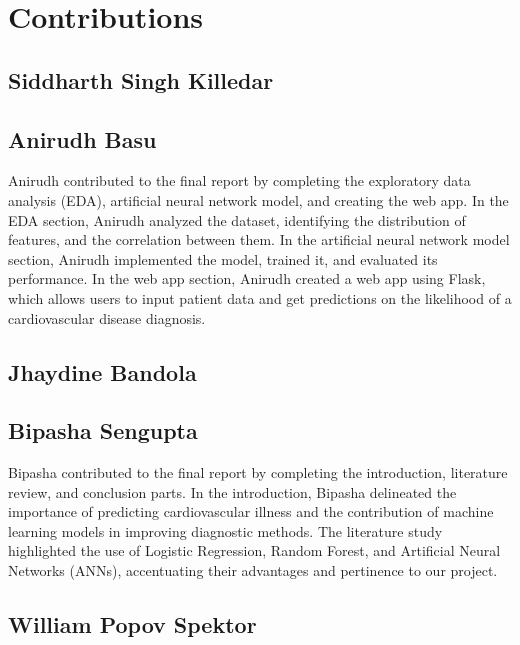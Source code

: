 \section{Contributions}

\subsection{Siddharth Singh Killedar}

\subsection{Anirudh Basu}

Anirudh contributed to the final report by completing the exploratory data analysis (EDA), artificial neural network model, and creating the web app. In the EDA section, Anirudh analyzed the dataset, identifying the distribution of features, and the correlation between them. In the artificial neural network model section, Anirudh implemented the model, trained it, and evaluated its performance. In the web app section, Anirudh created a web app using Flask, which allows users to input patient data and get predictions on the likelihood of a cardiovascular disease diagnosis.

\subsection{Jhaydine Bandola}

\subsection{Bipasha Sengupta}
Bipasha contributed to the final report by completing the introduction, literature review, and conclusion parts. In the introduction, Bipasha delineated the importance of predicting cardiovascular illness and the contribution of machine learning models in improving diagnostic methods. The literature study highlighted the use of Logistic Regression, Random Forest, and Artificial Neural Networks (ANNs), accentuating their advantages and pertinence to our project.

\subsection{William Popov Spektor}
